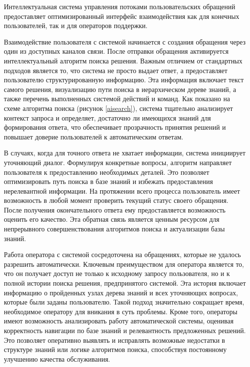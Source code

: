 
Интеллектуальная система управления потоками пользовательских обращений предоставляет оптимизированный интерфейс взаимодействия как для конечных пользователей, так и для операторов поддержки.

Взаимодействие пользователя с системой начинается с создания обращения через один из доступных каналов связи. После отправки обращения активируется интеллектуальный алгоритм поиска решения. Важным отличием от стандартных подходов является то, что система не просто выдает ответ, а предоставляет пользователю структурированную информацию. Эта информация включает текст самого решения, визуализацию пути поиска в иерархическом дереве знаний, а также перечень выполненных системой действий и команд. Как показано на схеме алгоритма поиска (рисунок \ref{aisearch}), система тщательно анализирует контекст запроса и определяет, достаточно ли имеющихся знаний для формирования ответа, что обеспечивает прозрачность принятия решений и повышает доверие пользователей к автоматическим ответам.

В случаях, когда для точного ответа не хватает информации, система инициирует уточняющий диалог. Формулируя конкретные вопросы, алгоритм направляет пользователя к предоставлению необходимых деталей. Это позволяет оптимизировать путь поиска в базе знаний и избежать предоставления нерелевантной информации. На протяжении всего процесса пользователь имеет возможность в любой момент проверить текущий статус своего обращения. После получения окончательного ответа ему предоставляется возможность оценить его качество. Эта обратная связь является ценным ресурсом для непрерывного совершенствования алгоритмов поиска и актуализации базы знаний.

Работа оператора с системой сосредоточена на обращениях, которые не удалось разрешить автоматически. Ключевым преимуществом для оператора является то, что он получает доступ не только к исходному запросу пользователя, но и к полной истории поиска решения, предпринятого системой. Эта история включает информацию о пройденных узлах дерева знаний и всех уточняющих вопросах, которые были заданы пользователю. Такой подход значительно сокращает время, необходимое оператору для вникания в суть проблемы. Кроме того, операторы имеют возможность анализировать работу автоматической системы, оценивая корректность навигации по базе знаний и релевантность предложенных решений. Это позволяет оперативно выявлять и исправлять возможные недостатки в структуре знаний или логике алгоритмов поиска, способствуя постоянному улучшению качества обслуживания.

